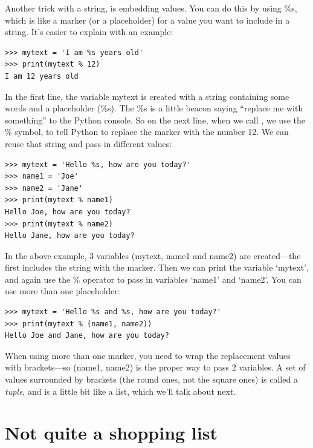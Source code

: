Another trick with a string, is embedding values.  You can do this by using \%s, which is like a marker (or a placeholder) for a value you want to include in a string.  It's easier to explain with an example:

\begin{listing}
\begin{verbatim}
>>> mytext = 'I am %s years old'
>>> print(mytext % 12)
I am 12 years old
\end{verbatim}
\end{listing}

In the first line, the variable mytext is created with a string containing some words and a placeholder (\%s).  The \%s is a little beacon saying ``replace me with something'' to the Python console.  So on the next line, when we call , we use the \% symbol, to tell Python to replace the marker with the number 12. We can reuse that string and pass in different values:

\begin{listing}
\begin{verbatim}
>>> mytext = 'Hello %s, how are you today?'
>>> name1 = 'Joe'
>>> name2 = 'Jane'
>>> print(mytext % name1)
Hello Joe, how are you today?
>>> print(mytext % name2)
Hello Jane, how are you today?
\end{verbatim}
\end{listing}

In the above example, 3 variables (mytext, name1 and name2) are created---the first includes the string with the marker.  Then we can print the variable `mytext', and again use the \% operator to pass in variables `name1' and `name2'.  You can use more than one placeholder:

\begin{listing}
\begin{verbatim}
>>> mytext = 'Hello %s and %s, how are you today?'
>>> print(mytext % (name1, name2))
Hello Joe and Jane, how are you today?
\end{verbatim}
\end{listing}

When using more than one marker, you need to wrap the replacement values with brackets---so (name1, name2) is the proper way to pass 2 variables. A set of values surrounded by brackets (the round ones, not the square ones) is called a \emph{tuple}, and is a little bit like a list, which we'll talk about next.

\section{Not quite a shopping list}

